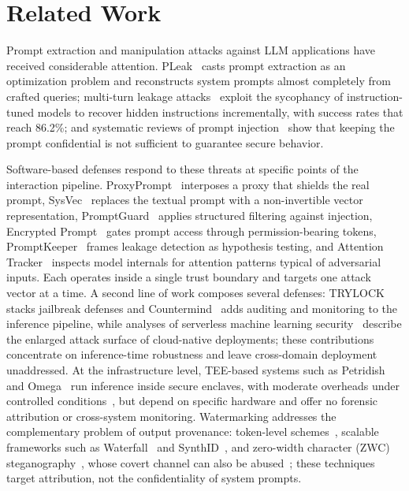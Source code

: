 \section{Related Work}
\label{sec:related}

Prompt extraction and manipulation attacks against LLM applications have received considerable attention. PLeak~\cite{hui2024pleak} casts prompt extraction as an optimization problem and reconstructs system prompts almost completely from crafted queries; multi-turn leakage attacks~\cite{multiturn2024} exploit the sycophancy of instruction-tuned models to recover hidden instructions incrementally, with success rates that reach 86.2\%; and systematic reviews of prompt injection~\cite{promptinjection2026} show that keeping the prompt confidential is not sufficient to guarantee secure behavior.

Software-based defenses respond to these threats at specific points of the interaction pipeline. ProxyPrompt~\cite{proxyprompt2025} interposes a proxy that shields the real prompt, SysVec~\cite{sysvec2025} replaces the textual prompt with a non-invertible vector representation, PromptGuard~\cite{promptguard2026} applies structured filtering against injection, Encrypted Prompt~\cite{encryptedprompt2025} gates prompt access through permission-bearing tokens, PromptKeeper~\cite{promptkeeper2024} frames leakage detection as hypothesis testing, and Attention Tracker~\cite{attentiontracker2025} inspects model internals for attention patterns typical of adversarial inputs. Each operates inside a single trust boundary and targets one attack vector at a time. A second line of work composes several defenses: TRYLOCK~\cite{trylock2026} stacks jailbreak defenses and Countermind~\cite{countermind2025} adds auditing and monitoring to the inference pipeline, while analyses of serverless machine learning security~\cite{sas2026} describe the enlarged attack surface of cloud-native deployments; these contributions concentrate on inference-time robustness and leave cross-domain deployment unaddressed. At the infrastructure level, TEE-based systems such as Petridish~\cite{petridish2024} and Omega~\cite{omega2025} run inference inside secure enclaves, with moderate overheads under controlled conditions~\cite{teeperf2025}, but depend on specific hardware and offer no forensic attribution or cross-system monitoring. Watermarking addresses the complementary problem of output provenance: token-level schemes~\cite{kirchenbauer2023watermark}, scalable frameworks such as Waterfall~\cite{waterfall2024} and SynthID~\cite{synthid2024}, and zero-width character (ZWC) steganography~\cite{zheng2020zwc}, whose covert channel can also be abused~\cite{stegocollusion2024}; these techniques target attribution, not the confidentiality of system prompts.

